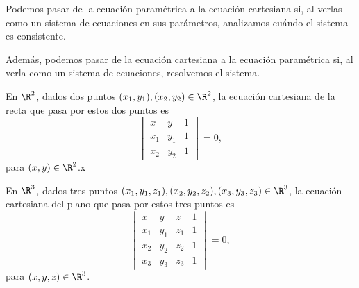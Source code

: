 \documentclass[a4,11pt]{aleph-notas}
\begin{document}
\begin{advertencia}
    Podemos pasar de la ecuación paramétrica a la ecuación cartesiana si, al verlas como un sistema de ecuaciones en sus parámetros, analizamos cuándo el sistema es consistente.
    
    Además, podemos pasar de la ecuación cartesiana a la ecuación paramétrica si, al verla como un sistema de ecuaciones, resolvemos el sistema.
\end{advertencia}

\begin{advertencia}
    En $\R^2$, dados dos puntos $(x_1,y_1),(x_2,y_2)\in\R^2$, la ecuación cartesiana de la recta que pasa por estos dos puntos es
    \[
        \begin{vmatrix}
            x & y & 1\\
            x_1 & y_1 & 1\\
            x_2 & y_2 & 1
        \end{vmatrix}
        = 0,
    \]
    para $(x,y)\in\R^2$.x
\end{advertencia}

\begin{advertencia}
    En $\R^3$, dados tres puntos $(x_1,y_1,z_1),(x_2,y_2,z_2),(x_3,y_3,z_3)\in\R^3$, la ecuación cartesiana del plano que pasa por estos tres puntos es
    \[
        \begin{vmatrix}
            x & y & z & 1\\
            x_1 & y_1 & z_1 & 1\\
            x_2 & y_2 & z_2 & 1\\
            x_3 & y_3 & z_3 & 1
        \end{vmatrix}
        = 0,
    \]
    para $(x,y,z)\in\R^3$.
\end{advertencia}
\end{document}
